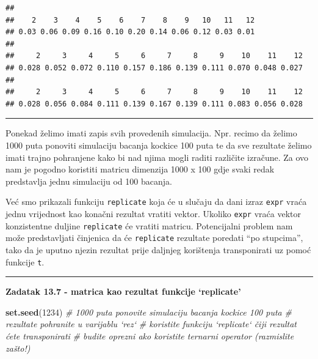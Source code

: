 \documentclass[]{book}
\newenvironment{Shaded}{\begin{snugshade}}{\end{snugshade}}
\newcommand{\KeywordTok}[1]{\textcolor[rgb]{0.13,0.29,0.53}{\textbf{#1}}}
\newcommand{\DecValTok}[1]{\textcolor[rgb]{0.00,0.00,0.81}{#1}}
\newcommand{\StringTok}[1]{\textcolor[rgb]{0.31,0.60,0.02}{#1}}
\newcommand{\CommentTok}[1]{\textcolor[rgb]{0.56,0.35,0.01}{\textit{#1}}}
\newcommand{\OperatorTok}[1]{\textcolor[rgb]{0.81,0.36,0.00}{\textbf{#1}}}
\newcommand{\NormalTok}[1]{#1}
\theoremstyle{definition}
\theoremstyle{definition}
\theoremstyle{definition}
\theoremstyle{remark}
\begin{document}
\begin{verbatim}
## 
##    2    3    4    5    6    7    8    9   10   11   12 
## 0.03 0.06 0.09 0.16 0.10 0.20 0.14 0.06 0.12 0.03 0.01 
## 
##     2     3     4     5     6     7     8     9    10    11    12 
## 0.028 0.052 0.072 0.110 0.157 0.186 0.139 0.111 0.070 0.048 0.027 
## 
##     2     3     4     5     6     7     8     9    10    11    12 
## 0.028 0.056 0.084 0.111 0.139 0.167 0.139 0.111 0.083 0.056 0.028
\end{verbatim}

\begin{center}\rule{0.5\linewidth}{\linethickness}\end{center}

Ponekad želimo imati zapis svih provedenih simulacija. Npr. recimo da
želimo 1000 puta ponoviti simulaciju bacanja kockice 100 puta te da sve
rezultate želimo imati trajno pohranjene kako bi nad njima mogli raditi
različite izračune. Za ovo nam je pogodno koristiti matricu dimenzija
1000 x 100 gdje svaki redak predstavlja jednu simulaciju od 100 bacanja.

Već smo prikazali funkciju \texttt{replicate} koja će u slučaju da dani
izraz \texttt{expr} vraća jednu vrijednost kao konačni rezultat vratiti
vektor. Ukoliko \texttt{expr} vraća vektor konzistentne duljine
\texttt{replicate} će vratiti matricu. Potencijalni problem nam može
predstavljati činjenica da će \texttt{replicate} rezultate poredati ``po
stupcima'', tako da je uputno njezin rezultat prije daljnjeg korištenja
transponirati uz pomoć funkcije \texttt{t}.

\begin{center}\rule{0.5\linewidth}{\linethickness}\end{center}

\textbf{Zadatak 13.7 - matrica kao rezultat funkcije `replicate'}

\begin{Shaded}
\begin{Highlighting}[]
\KeywordTok{set.seed}\NormalTok{(}\DecValTok{1234}\NormalTok{)}
\CommentTok{# 1000 puta ponovite simulaciju bacanja kockice 100 puta}
\CommentTok{# rezultate pohranite u varijablu `rez`}
\CommentTok{# koristite funkciju `replicate` čiji rezultat ćete transponirati}
\CommentTok{# budite oprezni ako koristite ternarni operator (razmislite zašto!)}
\end{Highlighting}
\end{Shaded}

\begin{Shaded}
\end{Shaded}
\end{document}
